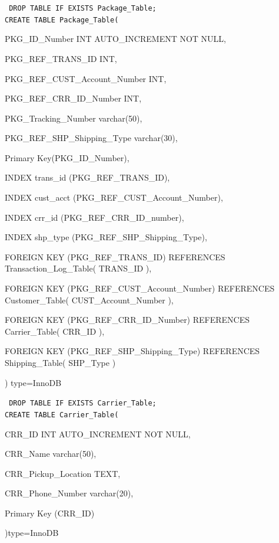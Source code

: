 \documentclass{report}
\begin{document}
        {\tt\small
        DROP TABLE IF EXISTS Package\_Table;\\

        CREATE TABLE Package\_Table(
        \begin{list}{}
            \item{PKG\_ID\_Number                           INT AUTO\_INCREMENT NOT NULL,}
            \item{PKG\_REF\_TRANS\_ID                        INT,}
            \item{PKG\_REF\_CUST\_Account\_Number             INT,}
            \item{PKG\_REF\_CRR\_ID\_Number                   INT,}
            \item{PKG\_Tracking\_Number varchar(50),}
            \item{PKG\_REF\_SHP\_Shipping\_Type varchar(30),}
            \item{Primary Key(PKG\_ID\_Number),}
            \item{INDEX trans\_id (PKG\_REF\_TRANS\_ID),}
            \item{INDEX cust\_acct (PKG\_REF\_CUST\_Account\_Number),}
            \item{INDEX crr\_id (PKG\_REF\_CRR\_ID\_number),}
            \item{INDEX shp\_type (PKG\_REF\_SHP\_Shipping\_Type),}
            \item{FOREIGN KEY (PKG\_REF\_TRANS\_ID) REFERENCES Transaction\_Log\_Table( TRANS\_ID ),}
            \item{FOREIGN KEY (PKG\_REF\_CUST\_Account\_Number) REFERENCES Customer\_Table( CUST\_Account\_Number ),}
            \item{FOREIGN KEY (PKG\_REF\_CRR\_ID\_Number) REFERENCES Carrier\_Table( CRR\_ID ),}
            \item{FOREIGN KEY (PKG\_REF\_SHP\_Shipping\_Type) REFERENCES Shipping\_Table( SHP\_Type )}
        \end{list}
        ) type=InnoDB\\
        }

        {\tt\small
        DROP TABLE IF EXISTS Carrier\_Table;\\

        CREATE TABLE Carrier\_Table(
        \begin{list}{}
            \item{CRR\_ID                          INT AUTO\_INCREMENT NOT NULL,}
            \item{CRR\_Name                        varchar(50),}
            \item{CRR\_Pickup\_Location             TEXT,}
            \item{CRR\_Phone\_Number                varchar(20),}
            \item{Primary Key (CRR\_ID)}
        \end{list}
        )type=InnoDB\\
        }
\end{document}
